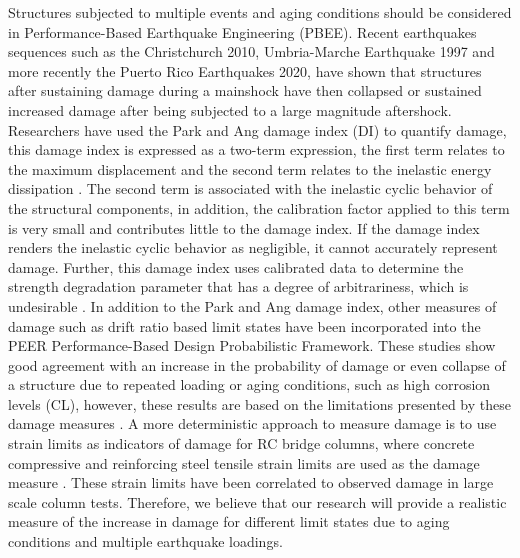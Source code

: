 Structures subjected to multiple events and aging conditions should be considered in Performance-Based Earthquake Engineering (PBEE). Recent earthquakes sequences such as the Christchurch 2010, Umbria-Marche Earthquake 1997 and more recently the Puerto Rico Earthquakes 2020, have shown that structures after sustaining damage during a mainshock have then collapsed or sustained increased damage after being subjected to a large magnitude aftershock\cite{Amato1998}\cite{Bradley}\cite{Miranda2020}. Researchers have used the Park and Ang damage index (DI) to quantify damage, this damage index is expressed as a two-term expression, the first term relates to the maximum displacement and the second term relates to the inelastic energy dissipation \cite{Young-JiPark1985}. The second term is associated with the inelastic cyclic behavior of the structural components, in addition, the calibration factor applied to this term is very small and contributes little to the damage index. If the damage index renders the inelastic cyclic behavior as negligible, it cannot accurately represent damage. Further, this damage index uses calibrated data to determine the strength degradation parameter that has a degree of arbitrariness, which is undesirable \cite{Williams1995}. In addition to the Park and Ang damage index, other measures of damage such as drift ratio based limit states have been incorporated into the PEER Performance-Based Design Probabilistic Framework\cite{Padgett2007}\cite{Ghosh2015}\cite{Shekhar2018}. These studies show good agreement with an increase in the probability of damage or even collapse of a structure due to repeated loading or aging conditions, such as high corrosion levels (CL), however, these results are based on the limitations presented by these damage measures \cite{Shekhar2018}. A more deterministic approach to measure damage is to use strain limits as indicators of damage for RC bridge columns, where concrete compressive and reinforcing steel tensile strain limits are used as the damage measure \cite{Goodnight2016}. These strain limits have been correlated to observed damage in large scale column tests. Therefore, we believe that our research will provide a realistic measure of the increase in damage for different limit states due to aging conditions and multiple earthquake loadings. 

